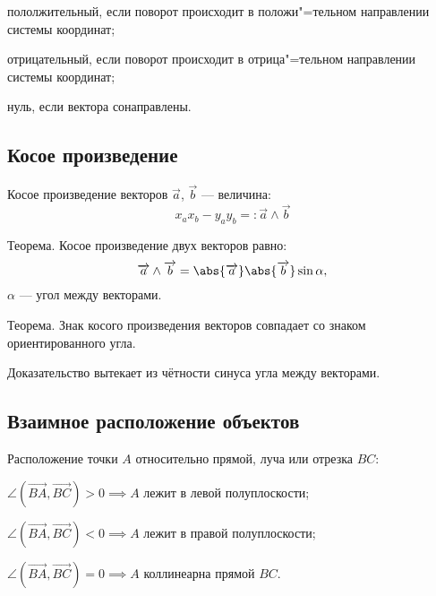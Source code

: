 \begin{list*}
\item{\bold пололжительный}, если поворот происходит в {\ital положи"=тельном} направлении системы координат;
\item{\bold отрицательный}, если поворот происходит в {\ital отрица"=тельном} направлении системы координат;
\item{\bold нуль}, если вектора {\ital сонаправлены}.
\end{list*}

\subsection{Косое произведение}

{\bold Косое произведение} {\ital векторов} $\overrightarrow{a}$, $\overrightarrow{b}$ --- величина:
$$x_ax_b-y_ay_b=:\overrightarrow{a}\land\overrightarrow{b}$$
\begin{theorem}
{\bold Теорема.} Косое произведение двух векторов равно:
$$\overrightarrow{a}\land\overrightarrow{b}=\abs{\overrightarrow{a}}\abs{\overrightarrow{b}}\sin\alpha,$$
$\alpha$ --- угол между векторами.
\end{theorem}

\begin{theorem}
{\bold Теорема.} Знак косого произведения векторов {\ital совпадает} со знаком ориентированного угла.
\end{theorem}

Доказательство вытекает из {\ital чётности} синуса угла между векторами.

\subsection{Взаимное расположение объектов}

Расположение {\ital точки} $A$ относительно {\ital прямой, луча или отрезка} $BC$:

\begin{list*}
\item$\angle(\overrightarrow{BA},\overrightarrow{BC})\greater 0\implies A$ лежит в {\bold левой} полуплоскости;
\item$\angle(\overrightarrow{BA},\overrightarrow{BC})\less 0\implies A$ лежит в {\bold правой} полуплоскости;
\item$\angle(\overrightarrow{BA},\overrightarrow{BC})=0\implies A$ {\bold коллинеарна} прямой $BC$.
\end{list*}

